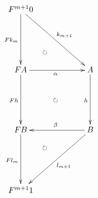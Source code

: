\documentclass[12pt]{article}
\begin{document}
\pagestyle{empty}

\begin{align*}
  \vcenter{
    \xymatrix@=60pt{
      F^{m + 1} 0
      \ar@{->}[d]_{F k_m}
      \ar@{->}[rd]^{k_{m + 1}}
      \ar@/_20pt/@{{}{ }{}}[rd]|{\circlearrowright}
      \\
      F A
      \ar@{->}[r]_{\alpha}
      \ar@{->}[d]_{F h}
      \ar@{{}{ }{}}[rd]|{\circlearrowright}
      &
      A
      \ar@{->}[d]_{h}
      \\
      F B
      \ar@{->}[d]_{F l_m}
      &
      B
      \ar@{->}[l]_{\beta}
      \ar@{->}[ld]^{l_{m + 1}}
      \ar@/_20pt/@{{}{ }{}}[ld]|{\circlearrowright}
      \\
      F^{m + 1} 1
    }
  }
\end{align*}
\end{document}
